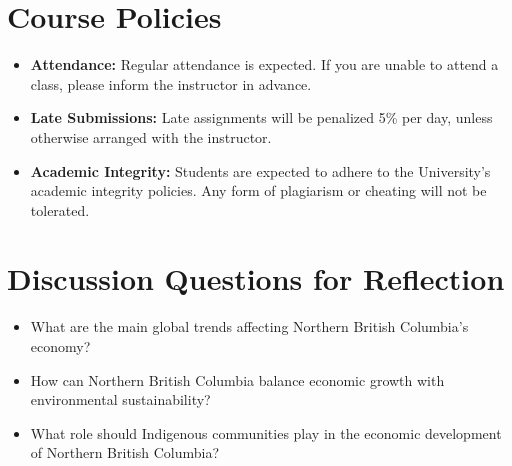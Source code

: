 \documentclass{article}
\begin{document}
\section*{Course Policies}
\begin{itemize}
    \item \textbf{Attendance:} Regular attendance is expected. If you are unable to attend a class, please inform the instructor in advance.
    \item \textbf{Late Submissions:} Late assignments will be penalized 5\% per day, unless otherwise arranged with the instructor.
    \item \textbf{Academic Integrity:} Students are expected to adhere to the University’s academic integrity policies. Any form of plagiarism or cheating will not be tolerated.
\end{itemize}

\section*{Discussion Questions for Reflection}
\begin{itemize}
    \item What are the main global trends affecting Northern British Columbia’s economy?
    \item How can Northern British Columbia balance economic growth with environmental sustainability?
    \item What role should Indigenous communities play in the economic development of Northern British Columbia?
\end{itemize}
\end{document}
